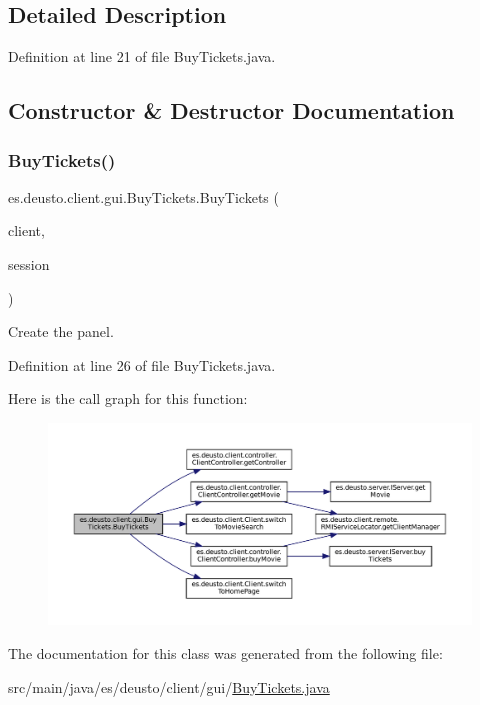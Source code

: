 \subsection{Detailed Description}


Definition at line 21 of file Buy\+Tickets.\+java.



\subsection{Constructor \& Destructor Documentation}
\mbox{\label{classes_1_1deusto_1_1client_1_1gui_1_1_buy_tickets_a550c5b4787c8ffd333049cf8d6c32e48}} 
\subsubsection{\texorpdfstring{BuyTickets()}{BuyTickets()}}
{\footnotesize\ttfamily es.\+deusto.\+client.\+gui.\+Buy\+Tickets.\+Buy\+Tickets (\begin{DoxyParamCaption}\item[{\mbox{\hyperlink{classes_1_1deusto_1_1client_1_1_client}{Client}}}]{client,  }\item[{\mbox{\hyperlink{classes_1_1deusto_1_1server_1_1data_1_1_session_d_t_o}{Session\+D\+TO}}}]{session }\end{DoxyParamCaption})}

Create the panel. 

Definition at line 26 of file Buy\+Tickets.\+java.

Here is the call graph for this function\+:
\nopagebreak
\begin{figure}[H]
\begin{center}
\leavevmode
\includegraphics[width=350pt]{classes_1_1deusto_1_1client_1_1gui_1_1_buy_tickets_a550c5b4787c8ffd333049cf8d6c32e48_cgraph}
\end{center}
\end{figure}


The documentation for this class was generated from the following file\+:\begin{DoxyCompactItemize}
\item 
src/main/java/es/deusto/client/gui/\mbox{\hyperlink{_buy_tickets_8java}{Buy\+Tickets.\+java}}\end{DoxyCompactItemize}
